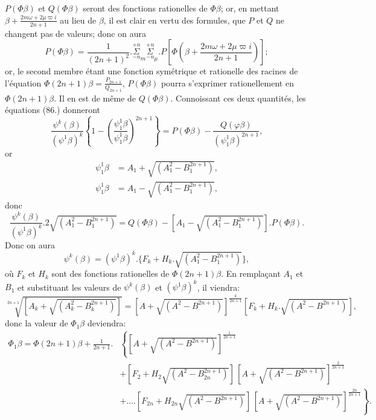 \documentclass{article}
\begin{document}
$P(\Phi\beta)$ et $Q(\Phi\beta)$ seront des fonctions rationelles de $\Phi\beta$; or, en mettant $\beta+\frac{2m\omega+2\mu\varpi i}{2n+1}$ au lieu de $\beta$, il est clair en vertu des formules, que $P$ et $Q$ ne changent pas de valeurs; donc on aura
\[ P(\Phi\beta)=\frac{1}{(2n+1)^{2}}.\overset{+n}{\underset{-n}{\Sigma}}_{m}\overset{+n}{\underset{-n}{\Sigma}}_{\mu}.P\left[\Phi\left(\beta+\frac{2m\omega+2\mu\varpi i}{2n+1}\right)\right]; \]
or, le second membre étant une fonction symétrique et rationelle des racines de l'équation $\Phi(2n+1)\beta=\frac{P_{2n+1}}{Q_{2n+1}}$, $P(\Phi\beta)$ pourra s'exprimer rationellement en $\Phi(2n+1)\beta$. Il en est de même de $Q(\Phi\beta)$. Connoissant ces deux quantités, les équations (86.) donneront
\[ \frac{\psi^{k}(\beta)}{(\psi^{1}\beta)^{k}}\left\{1-\left(\frac{\psi_{1}^{1}\beta}{\psi_{1}^{1}\beta}\right)^{2n+1}\right\}=P(\Phi\beta)-\frac{Q(\varphi\beta)}{(\psi_{1}^{1}\beta)^{2n+1}}, \]
or
\[ \begin{aligned}
\psi_{1}^{1}\beta&=A_{1}+\sqrt{(A_{1}^{2}-B_{1}^{2n+1})},\\
\psi_{1}^{1}\beta&=A_{1}-\sqrt{(A_{1}^{2}-B_{1}^{2n+1})},
\end{aligned} \]
donc
\[ \frac{\psi^{k}(\beta)}{(\psi^{1}\beta)^{k}}.2\sqrt{(A_{1}^{2}-B_{1}^{2n+1})}=Q(\Phi\beta)-[A_{1}-\sqrt{(A_{1}^{2}-B_{1}^{2n+1})}].P(\Phi\beta). \]
Donc on aura
\[ \psi^{k}(\beta)=(\psi^{1}\beta)^{k}.\{F_{k}+H_{k}.\sqrt{(A_{1}^{2}-B_{1}^{2n+1})}\}, \]
où $F_{k}$ et $H_{k}$ sont des fonctions rationelles de $\Phi(2n+1)\beta$. En remplaçant $A_{1}$ et $B_{1}$ et substituant les valeurs de $\psi^{k}(\beta)$ et $(\psi^{1}\beta)^{k}$, il viendra:
\[ \sqrt[2n+1]{[A_{k}+\sqrt{(A_{k}^{2}-B_{k}^{2n+1})}]}=[A+\sqrt{(A^{2}-B^{2n+1})}]^{\frac{k}{2n+1}}[F_{k}+H_{k}.\sqrt{(A^{2}-B^{2n+1})}], \]
donc la valeur de $\Phi_{1}\beta$ deviendra:
\[ \begin{aligned}
\Phi_{1}\beta=\Phi(2n+1)\beta+\frac{1}{2n+1}.&\left\{[A+\sqrt{(A^{2}-B^{2n+1})}]^{\frac{1}{2n+1}}\right.\\
&+[F_{2}+H_{2}\sqrt{(A^{2}-B_{2n}^{2n+1})}]\,[A+\sqrt{(A^{2}-B^{2n+1})}]^{\frac{2}{2n+1}}\\
&\left.+....[F_{2n}+H_{2n}\sqrt{(A^{2}-B^{2n+1})}]\,[A+\sqrt{(A^{2}-B^{2n+1})}]^{\frac{2n}{2n+1}}\right\}.
\end{aligned} \tag{87.} \]
\end{document}

